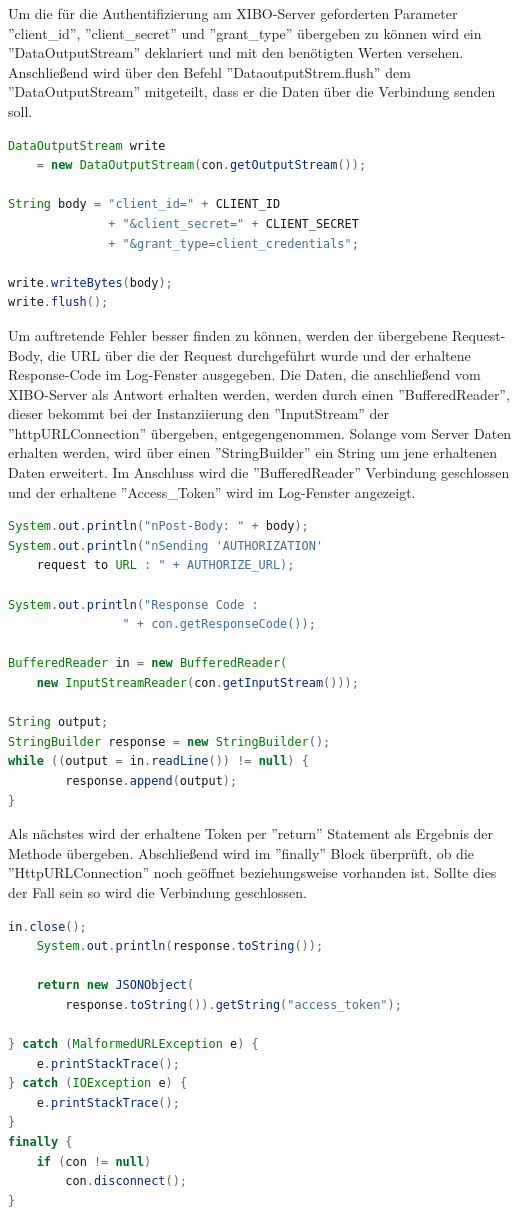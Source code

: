 Um die für die Authentifizierung am XIBO-Server geforderten Parameter ''client\_id'', ''client\_secret'' und ''grant\_type'' übergeben zu können wird ein ''DataOutputStream'' deklariert und mit den benötigten Werten versehen. Anschließend wird über den Befehl  ''DataoutputStrem.flush'' dem ''DataOutputStream'' mitgeteilt, dass er die Daten über die Verbindung senden soll.
\begin{lstlisting}[language=Java,caption={Erstellen und senden des JSON-Body}]
DataOutputStream write 
	= new DataOutputStream(con.getOutputStream());
	 
String body = "client_id=" + CLIENT_ID
              + "&client_secret=" + CLIENT_SECRET
              + "&grant_type=client_credentials";

write.writeBytes(body);
write.flush();
\end{lstlisting}

Um auftretende Fehler besser finden zu können, werden der übergebene Request-Body, die URL über die der Request durchgeführt wurde und der erhaltene Response-Code im Log-Fenster ausgegeben. Die Daten, die anschließend vom XIBO-Server als Antwort erhalten werden, werden durch einen ''BufferedReader'', dieser bekommt bei der Instanziierung den ''InputStream'' der ''httpURLConnection'' übergeben, entgegengenommen. Solange vom Server Daten erhalten werden, wird über einen ''StringBuilder'' ein String um jene erhaltenen Daten erweitert. Im Anschluss wird die ''BufferedReader'' Verbindung geschlossen und der erhaltene ''Access\_Token'' wird im Log-Fenster angezeigt.

\begin{lstlisting}[language=Java,caption={Erhalt der Daten vom Server}]
System.out.println("nPost-Body: " + body);
System.out.println("nSending 'AUTHORIZATION'
    request to URL : " + AUTHORIZE_URL);
             
System.out.println("Response Code :
				" + con.getResponseCode());

BufferedReader in = new BufferedReader(
    new InputStreamReader(con.getInputStream()));
    
String output;
StringBuilder response = new StringBuilder();
while ((output = in.readLine()) != null) {
        response.append(output);
}
\end{lstlisting}

Als nächstes wird der erhaltene Token per ''return'' Statement als Ergebnis der Methode übergeben. Abschließend wird im ''finally'' Block überprüft, ob die ''HttpURLConnection'' noch geöffnet beziehungsweise vorhanden ist. Sollte dies der Fall sein so wird die Verbindung geschlossen.
\begin{lstlisting}[language=Java,caption={Rückgabe des Token und schließen der Verbindung}]
	in.close();
	System.out.println(response.toString());

	return new JSONObject(
     	response.toString()).getString("access_token");
     	
} catch (MalformedURLException e) {
	e.printStackTrace();
} catch (IOException e) {
    e.printStackTrace();
}
finally {
	if (con != null)
    	con.disconnect();
}
\end{lstlisting}




